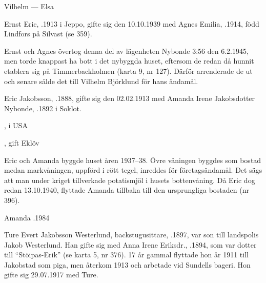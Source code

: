 Vilhelm   ---  Elsa 


Ernst Eric, .1913 i Jeppo, gifte sig den 10.10.1939 med Agnes Emilia, .1914, född Lindfors på Silvast (se 359).
\begin{jhchildren}
  \item {}
  \item {}
  \item {}
\end{jhchildren}

Ernst och Agnes övertog denna del av lägenheten Nybonde 3:56 den 6.2.1945, men torde knappast ha bott i det nybyggda huset, eftersom de redan då hunnit etablera sig på Timmerbackholmen (karta 9, nr 127). Därför arrenderade de ut och senare sålde det till Vilhelm Björklund för hans ändamål.


Eric Jakobsson, .1888, gifte sig den 02.02.1913 med Amanda Irene Jakobsdotter Nybonde, .1892 i Soklot.
\begin{jhchildren}
  \item {}, i USA
  \item {}
  \item {}, gift Eklöv
\end{jhchildren}

Eric och Amanda byggde huset åren 1937--38. Övre våningen byggdes som bostad medan markvåningen, uppförd i rött tegel, inreddes för 	företagsändamål. Det sägs att man under kriget tillverkade potatismjöl i husets  bottenvåning. Då Eric dog redan 13.10.1940, flyttade Amanda tillbaka till den ursprungliga bostaden (nr 396).

Amanda .1984





Ture Evert Jakobsson Westerlund, backstugusittare,  .1897, var son till landspolis Jakob Westerlund. Han gifte sig med Anna Irene Eriksdr., .1894, som var dotter till ``Stöipas-Erik'' (se karta 5, nr 376). 17 år gammal flyttade hon år 1911 till Jakobstad som piga, men återkom 1913 och arbetade vid Sundells bageri. Hon gifte sig 29.07.1917 med Ture.

